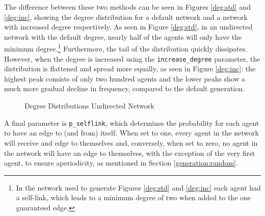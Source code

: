 \documentclass[a4paper, 12pt]{report}
\begin{document}
The difference between these two methods can be seen in Figures \ref{deg:std} and \ref{deg:inc}, showing the degree distribution for a default network and a network with increased degree respectively. As seen in Figure \ref{deg:std}, in an undirected network with the default degree, nearly half of the agents will only have the minimum degree.\footnote{In the network used to generate Figures \ref{deg:std} and \ref{deg:inc} each agent had a self-link, which leads to a minimum degree of two when added to the one guaranteed edge.} Furthermore, the tail of the distribution quickly dissipates. However, when the degree is increased using the \texttt{increase\_degree} parameter, the distribution is flattened and spread more equally, as seen in Figure \ref{deg:inc}: the highest peak consists of only two hundred agents and the lower peaks show a much more gradual decline in frequency, compared to the default generation.
\begin{figure}[!htbp]
  \centering
  \hfill
  \caption{Degree Distributions Undirected Network}
\end{figure}

\noindent A final parameter is \texttt{p\_selflink}, which determines the probability for each agent to have an edge to (and from) itself. When set to one, every agent in the network will receive and edge to themselves and, conversely, when set to zero, no agent in the network will have an edge to themselves, with the exception of the very first agent, to ensure aperiodicity, as mentioned in Section \ref{generation:random}.
\end{document}

